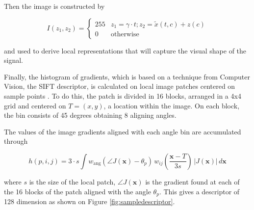 \documentclass[entropy,article,submit,moreauthors,pdftex,10pt,a4paper]{mdpi}
\begin{document}
Then the image is constructed by

\begin{equation}
I(z_1,z_2) = \left\{ \begin{array}{rl}
255 & z_1 = \gamma \cdot t; z_2 = \tilde{x}(t,c) + z(c) \\
0   & \mbox{otherwise}
\end{array}\right.
\label{eq:images}
\end{equation}

\noindent and used to derive local representations that will capture the visual shape of the signal.

Finally, the histogram of gradients, which is based on a technique from Computer Vision, the SIFT \citep{Lowe2004} descriptor, is calculated on local image patches centered on sample points \citep{Vedaldi2010}.
To do this, the patch is divided in 16 blocks, arranged in a 4x4 grid and centered on $T = (x,y)$, a location within the image.  On each block, the bin consists of 45 degrees obtaining 8 aligning angles.

The values of the image gradients aligned with each angle bin are accumulated through

\begin{equation}
 h(p,i,j) = 3 \cdot s \int w_\mathrm{ang}(\angle J(\mathbf{x}) - \theta_p)\, w_{ij}\left(\frac{\mathbf{x} - T}{3 s}\right)\, |J(\mathbf{x})|\, d\mathbf{x}
\label{eq:histogram}
\end{equation}

\noindent where $s$ is the size of the local patch, $\angle J(\mathbf{x})$ is the gradient found at each of the 16 blocks of the patch aligned with the angle $\theta_p$.  
This gives a descriptor of 128 dimension as shown on Figure \ref{fig:sampledescriptor}.  
\end{document}
